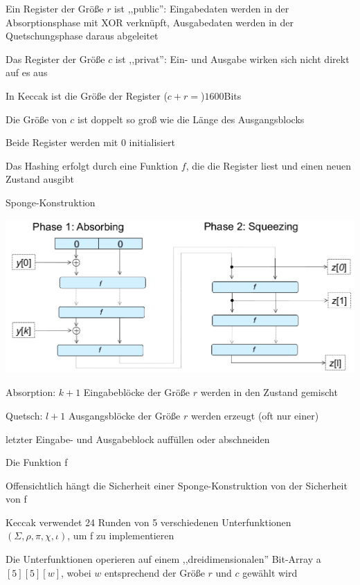 \documentclass[a4paper]{article}
\begin{document}
\begin{multicols}{3}
\begin{itemize*}
\begin{itemize*}
                  \item Ein Register der Größe $r$ ist ,,public'': Eingabedaten werden in der Absorptionsphase mit XOR verknüpft, Ausgabedaten werden in der Quetschungsphase daraus abgeleitet
                  \item Das Register der Größe $c$ ist ,,privat'': Ein- und Ausgabe wirken sich nicht direkt auf es aus
                  \item In Keccak ist die Größe der Register ($c+r=$)$1600$Bits
                  \item Die Größe von $c$ ist doppelt so groß wie die Länge des Ausgangsblocks
                  \item Beide Register werden mit $0$ initialisiert
            \end{itemize*}
            \item Das Hashing erfolgt durch eine Funktion $f$, die die Register liest und einen neuen Zustand ausgibt
            \item Sponge-Konstruktion
            \begin{itemize*}
                  \item \includegraphics[width=.6\linewidth]{Assets/NetworkSecurity-sha-3.png}
                  \item Absorption: $k+1$ Eingabeblöcke der Größe $r$ werden in den Zustand gemischt
                  \item Quetsch: $l+1$ Ausgangsblöcke der Größe $r$ werden erzeugt (oft nur einer)
                  \item letzter Eingabe- und Ausgabeblock auffüllen oder abschneiden
            \end{itemize*}
            \item Die Funktion f
            \begin{itemize*}
                  \item Offensichtlich hängt die Sicherheit einer Sponge-Konstruktion von der Sicherheit von f
                  \item Keccak verwendet 24 Runden von 5 verschiedenen Unterfunktionen $(\Sigma,\rho,\pi,\chi,\iota)$, um f zu implementieren
                  \item Die Unterfunktionen operieren auf einem ,,dreidimensionalen'' Bit-Array a $[5][5][w]$, wobei $w$ entsprechend der Größe $r$ und $c$ gewählt wird

\end{itemize*}
\end{itemize*}
\end{multicols}
\end{document}
